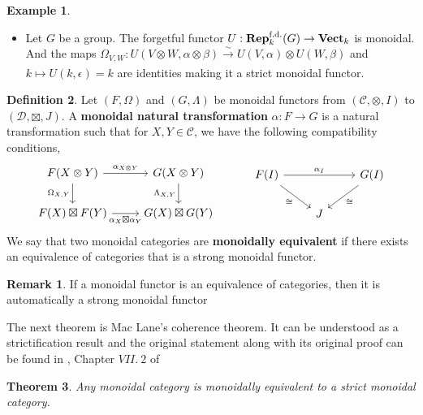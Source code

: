 \documentclass{article}
\theoremstyle{plain}
\newtheorem{theorem}{Theorem}[subsection]
\theoremstyle{definition}
\newtheorem{definition}[theorem]{Definition}
\newtheorem{remark}{Remark}
\newtheorem{example}[theorem]{Example}
\DeclareMathOperator{\Vect}{\bf{Vect}}
\DeclareMathOperator{\Rep}{\bf{Rep}}
\begin{document}
\begin{example} \textbf{ }
\begin{itemize}
    \item[$a)$] Let $G$ be a group. The forgetful functor $U:\Rep_k^{\text{f.d.}}(G)\rightarrow \Vect_k$ is monoidal.\\
    And the maps $\Omega_{V,W}: U(V\otimes W,\alpha\otimes\beta) \xrightarrow[]{\sim} U(V,\alpha)\otimes U(W,\beta)$ and $k\mapsto U(k,\epsilon) =k$ are identities making it a strict monoidal functor.
\end{itemize}
\end{example}




\begin{definition}
    Let $(F,\Omega)$ and $(G, \Lambda)$ be monoidal functors from $(\mathcal{C},\otimes,I)$ to $(\mathcal{D},\boxtimes,J)$.
    A \textbf{monoidal natural transformation} $\alpha:F\rightarrow G$ is a natural transformation such that for $X,Y\in \mathcal{C}$, we have the following compatibility conditions,
    \[
    \begin{tikzcd}
        F(X\otimes Y) 
        \arrow[r, "\alpha_{X\otimes Y}"] \arrow[d, "\Omega_{X,Y}"'] & 
        G(X\otimes Y) 
        \arrow[d, "\Lambda_{X,Y}"']\\
        F(X)\boxtimes F(Y) 
        \arrow[r,"\alpha_X\boxtimes \alpha_Y"'] & 
        G(X) \boxtimes G(Y) 
    \end{tikzcd}
    \hspace{1cm}
    \begin{tikzcd}
        F(I) 
        \arrow[rr, "\alpha_I"] \arrow[dr,"\cong"']  && 
        G(I) 
        \arrow[dl,"\cong"]\\
        & J
    \end{tikzcd}
    \]
    We say that two monoidal categories are \textbf{monoidally equivalent} if there exists an equivalence of categories that is a strong monoidal functor.
\end{definition}
\begin{remark}
    If a monoidal functor is an equivalence of categories, then it is automatically a strong monoidal functor
\end{remark}


\noindent The next theorem is Mac Lane's coherence theorem. It can be understood as a strictification result and the original statement along with its original proof can be found in \cite{McLane_Sau}, Chapter $VII.\:2$ of 
\begin{theorem}
\label{Mac_Lane_coherence}
    Any monoidal category is monoidally equivalent to a strict monoidal category.
\end{theorem}
\end{document}
